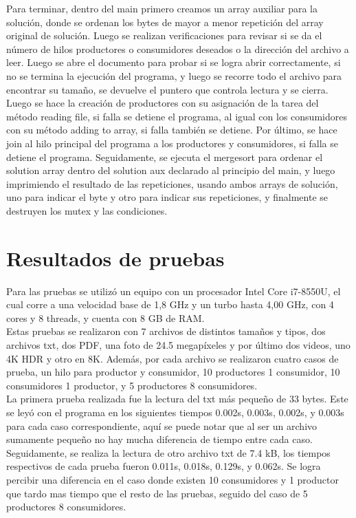 \documentclass[10pt, article, natbib]{IEEEtran}
\begin{document}
Para terminar, dentro del main primero creamos un array auxiliar para la solución, donde se ordenan los bytes de mayor a menor repetición del array original de solución. Luego se realizan verificaciones para revisar si se da el número de hilos productores o consumidores deseados o la dirección del archivo a leer. Luego se abre el documento para probar si se logra abrir correctamente, si no se termina la ejecución del programa, y luego se recorre todo el archivo para encontrar su tamaño, se devuelve el puntero que controla lectura y se cierra. Luego se hace la creación de productores con su asignación de la tarea del método reading file, si falla se detiene el programa, al igual con los consumidores con su método adding to array, si falla también se detiene. Por último, se hace join al hilo principal del programa a los productores y consumidores, si falla se detiene el programa.\cite{kerrisk_2010_pthread_join3} Seguidamente, se ejecuta el mergesort para ordenar el solution array dentro del solution aux declarado al principio del main, y luego imprimiendo el resultado de las repeticiones, usando ambos arrays de solución, uno para indicar el byte y otro para indicar sus repeticiones, y finalmente se destruyen los mutex y las condiciones.\\

\section{Resultados de pruebas}
Para las pruebas se utilizó un equipo con un procesador Intel Core i7-8550U, el cual corre a una velocidad base de 1,8 GHz y un turbo hasta 4,00 GHz, con 4 cores y 8 threads, y cuenta con 8 GB de RAM.\\

Estas pruebas se realizaron con 7 archivos de distintos tamaños y tipos, dos archivos txt, dos PDF, una foto de 24.5 megapíxeles y por último dos videos, uno 4K HDR y otro en 8K. Además, por cada archivo se realizaron cuatro casos de prueba, un hilo para productor y consumidor, 10 productores 1 consumidor, 10 consumidores 1 productor, y 5 productores 8 consumidores.\\

La primera prueba realizada fue la lectura del txt más pequeño de 33 bytes. Este se leyó con el programa en los siguientes tiempos 0.002s, 0.003s, 0.002s, y 0.003s para cada caso correspondiente, aquí se puede notar que al ser un archivo sumamente pequeño no hay mucha diferencia de tiempo entre cada caso.
Seguidamente, se realiza la lectura de otro archivo txt de 7.4 kB, los tiempos respectivos de cada prueba fueron 0.011s, 0.018s, 0.129s, y 0.062s. Se logra percibir una diferencia en el caso donde existen 10 consumidores y 1 productor que tardo mas tiempo que el resto de las pruebas, seguido del caso de 5 productores 8 consumidores.\\
\end{document}
